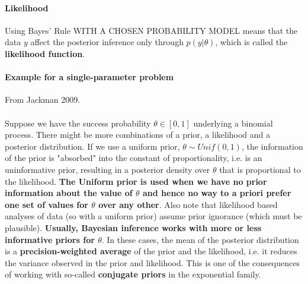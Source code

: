 \documentclass {article}
\begin{document}
\paragraph{Likelihood}
Using Bayes' Rule WITH A CHOSEN PROBABILITY MODEL means that the data $y$ affect the posterior inference only through $p(y | \theta)$, which is called the \textbf{likelihood function}. 

\paragraph {Example for a single-parameter problem}
From Jackman 2009.
\\
\\
Suppose we have the success probability $\theta \in [0,1]$ underlying a binomial process. There might be more combinations of a prior, a likelihood and a posterior distribution.
If we use a uniform prior, $\theta \sim Unif(0,1)$, the information of the prior is "absorbed" into the constant of proportionality, i.e. is an uninformative prior, resulting in a posterior density over $\theta$ that is proportional to the likelihood.      
\textbf{The Uniform prior is used when we have no prior information about the value of $\theta$ and hence no way to a priori prefer one set of values for $\theta$ over any other}.
Also note that likelihood based analyses of data (so with a uniform prior) assume prior ignorance (which must be plausible). 
\textbf{Usually, Bayesian inference works with more or less informative priors for $\theta$}.
In these cases, the mean of the posterior distribution is a \textbf{precision-weighted average} of the prior and the likelihood, i.e. it reduces the variance observed in the prior and likelihood.  
This is one of the consequences of working with so-called \textbf{conjugate priors} in the exponential family. 
\end{document}
